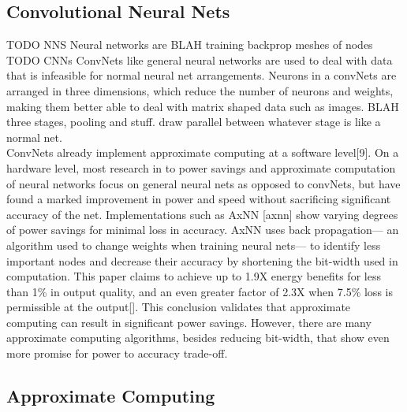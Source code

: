 \documentclass[conference]{IEEEtran}
\begin{document}
\subsection{Convolutional Neural Nets}
TODO NNS
	\indent Neural networks are BLAH training backprop meshes of nodes\\
	
TODO CNNs
	\indent ConvNets like general neural networks are used to deal with data that is infeasible for normal neural net arrangements. Neurons in a convNets are arranged in three dimensions, which reduce the number of neurons and weights, making them better able to deal with matrix shaped data such as images. BLAH three stages, pooling and stuff. draw parallel between whatever stage is like a normal net.  \\
	
	\indent ConvNets already implement approximate computing at a software level[9]. On a hardware level, most research in to power savings and approximate computation of neural networks focus on general neural nets as opposed to convNets, but have found a marked improvement in power and speed without sacrificing significant accuracy of the net. Implementations such as AxNN [axnn] show varying degrees of power savings for minimal loss in accuracy. AxNN uses back propagation--- an algorithm used to change weights when training neural nets--- to identify less important nodes and decrease their accuracy by shortening the bit-width used in computation. This paper claims to achieve up to 1.9X energy benefits for less than 1\% in output quality, and an even greater factor of 2.3X when 7.5\% loss is permissible at the output[]. This conclusion validates that approximate computing can result in significant power savings. However, there are many approximate computing algorithms, besides reducing bit-width, that show even more promise for power to accuracy trade-off.

\subsection{Approximate Computing}
\end{document}
